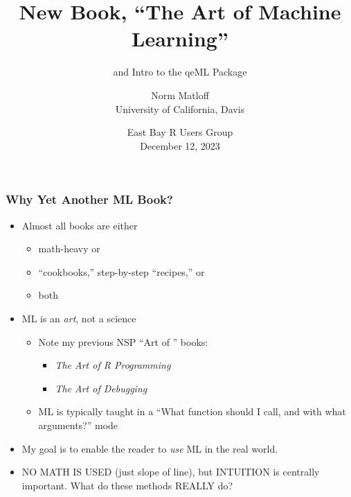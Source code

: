 \documentclass{beamer}
\title{New Book, ``The Art of Machine Learning''}
\subtitle{and Intro to the qeML Package}
\author{Norm Matloff \\
University of California, Davis \\
}
\date{
East Bay R Users Group \\
December 12, 2023 
}
\begin{document}
 


\begin{frame}
\titlepage


\end{frame}

\begin{frame} 
\frametitle{Why Yet Another ML Book?}\pause

\begin{itemize}

\item Almost all books are either 

   \begin{itemize}

   \item math-heavy or

   \item ``cookbooks,'' step-by-step ``recipes,'' or

   \item both

   \end{itemize} 
   \pause

\item ML is an \textit{art}, not a science

   \begin{itemize}

   \item Note my previous NSP ``Art of '' books:

   \begin{itemize}

      \item \textit{The Art of R Programming}
   
      \item \textit{The Art of Debugging}

   \end{itemize} 

   \item ML is typically taught in a ``What function should I call,
   and with what arguments?'' mode

   \end{itemize} 

\pause
\item My goal is to enable the reader to \textit{use} ML in the real
world.
\pause

\item NO MATH IS USED (just slope of line), but INTUITION is centrally
important.
\pause
What do these methods REALLY do?

\end{itemize} 

\end{frame} 
\end{document}
